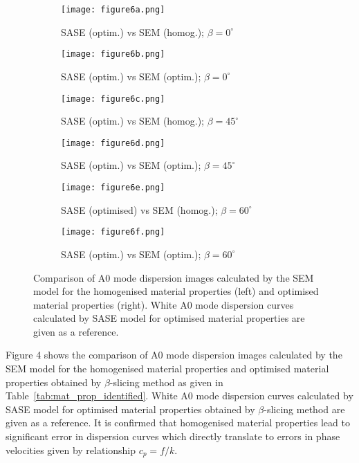 \documentclass[preprint,12pt]{elsarticle}
\begin{document}
\begin{figure} [h!]
	\centering
	\begin{subfigure}[b]{0.47\textwidth}
		\centering
		\texttt{[image: figure6a.png]}
		\caption{SASE (optim.) vs SEM (homog.); $\beta=0^{\circ}$}
		\label{fig:dispersion0deg_homog_num}
	\end{subfigure}
	\hfill
	\begin{subfigure}[b]{0.47\textwidth}
		\centering
		\texttt{[image: figure6b.png]}
		\caption{SASE (optim.) vs SEM (optim.); $\beta=0^{\circ}$}
		\label{fig:dispersion0deg_opt_num}
	\end{subfigure}
	\hfill
	\begin{subfigure}[b]{0.47\textwidth}
		\centering
		\texttt{[image: figure6c.png]}
		\caption{SASE (optim.) vs SEM (homog.); $\beta=45^{\circ}$}
		\label{fig:dispersion45deg_homog_num}
	\end{subfigure}
	\hfill
	\begin{subfigure}[b]{0.47\textwidth}
		\centering
		\texttt{[image: figure6d.png]}
		\caption{SASE (optim.) vs SEM (optim.); $\beta=45^{\circ}$}
		\label{fig:dispersion45deg_opt_num}
	\end{subfigure}
	\hfill
	\begin{subfigure}[b]{0.47\textwidth}
		\centering
		\texttt{[image: figure6e.png]}
		\caption{SASE (optimised) vs SEM (homog.); $\beta=60^{\circ}$}
		\label{fig:dispersion60deg_homog_num}
	\end{subfigure}
	\hfill
	\begin{subfigure}[b]{0.47\textwidth}
		\centering
		\texttt{[image: figure6f.png]}
		\caption{SASE (optim.) vs SEM (optim.); $\beta=60^{\circ}$}
		\label{fig:dispersion60deg_opt_num}
	\end{subfigure}
	\caption{Comparison of A0 mode dispersion images calculated by the SEM model for the homogenised material properties (left) and optimised material properties (right). White A0 mode dispersion curves calculated by SASE model for optimised material properties are given as a reference. }
	\label{fig:homog_opt_num}
\end{figure}

Figure 4 shows the comparison of A0 mode dispersion images calculated by the SEM model for the homogenised material properties and optimised material properties obtained by $\beta$-slicing method as given in Table~\ref{tab:mat_prop_identified}. 
White A0 mode dispersion curves calculated by SASE model for optimised material properties obtained by $\beta$-slicing method are given as a reference. 
It is confirmed that homogenised material properties lead to significant error in dispersion curves which directly translate to errors in phase velocities given by relationship $c_p= f/k$.
\end{document}
